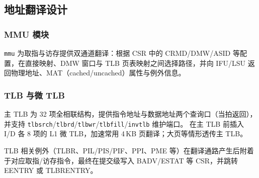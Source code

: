 \subsection{地址翻译设计}

\subsubsection{MMU 模块}

\texttt{mmu} 为取指与访存提供双通道翻译：根据 CSR 中的 CRMD/DMW/ASID 等配置，在直接映射、DMW 窗口与 TLB 页表映射之间选择路径，并向 IFU/LSU 返回物理地址、MAT（cached/uncached）属性与例外信息。

\subsubsection{TLB 与微 TLB}
主 TLB 为 32 项全相联结构，提供指令地址与数据地址两个查询口（当拍返回），并支持 \texttt{tlbsrch}/\texttt{tlbrd}/\texttt{tlbwr}/\texttt{tlbfill}/\texttt{invtlb} 维护端口。
在主 TLB 前插入 I/D 各 8 项的 L1 微 TLB，加速常用 4\,KB 页翻译；大页等情形透传主 TLB。

TLB 相关例外（TLBR、PIL/PIS/PIF、PPI、PME 等）在翻译通路产生后附着于对应取指/访存指令，最终在提交级写入 BADV/ESTAT 等 CSR，并跳转 EENTRY 或 TLBRENTRY。
